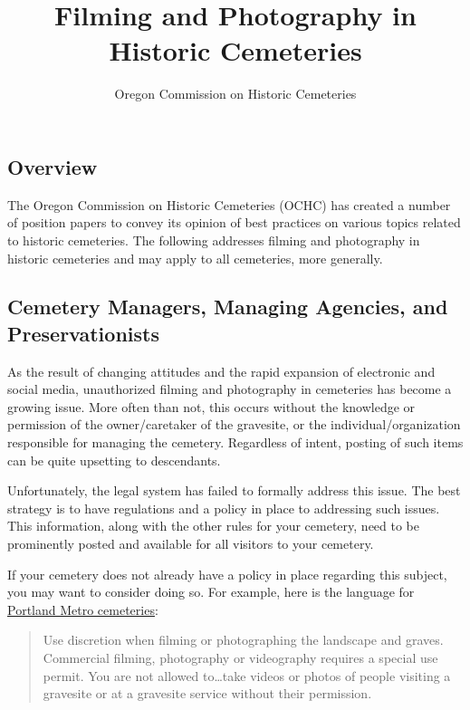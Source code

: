 \documentclass[]{article}
\title{Filming and Photography in Historic Cemeteries}
\author{Oregon Commission on Historic Cemeteries}
\date{}
\begin{document}
\maketitle


{
\hypersetup{linkcolor=black}
\setcounter{tocdepth}{4}
\tableofcontents
}
\subsection{Overview}\label{overview}

The Oregon Commission on Historic Cemeteries (OCHC) has created a number
of position papers to convey its opinion of best practices on various
topics related to historic cemeteries. The following addresses filming
and photography in historic cemeteries and may apply to all cemeteries,
more generally.

\subsection{Cemetery Managers, Managing Agencies, and
Preservationists}\label{cemetery-managers-managing-agencies-and-preservationists}

As the result of changing attitudes and the rapid expansion of
electronic and social media, unauthorized filming and photography in
cemeteries has become a growing issue. More often than not, this occurs
without the knowledge or permission of the owner/caretaker of the
gravesite, or the individual/organization responsible for managing the
cemetery. Regardless of intent, posting of such items can be quite
upsetting to descendants.

Unfortunately, the legal system has failed to formally address this
issue. The best strategy is to have regulations and a policy in place to
addressing such issues. This information, along with the other rules for
your cemetery, need to be prominently posted and available for all
visitors to your cemetery.

If your cemetery does not already have a policy in place regarding this
subject, you may want to consider doing so. For example, here is the
language for
\href{http://www.oregonmetro.gov/historic-cemeteries/visiting-cemeteries}{Portland
Metro cemeteries}:

\begin{quote}
Use discretion when filming or photographing the landscape and graves.
Commercial filming, photography or videography requires a special use
permit. You are not allowed to\ldots{}take videos or photos of people
visiting a gravesite or at a gravesite service without their permission.
\end{quote}
\end{document}
